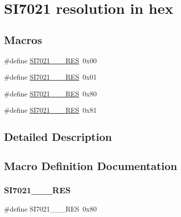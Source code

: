 \hypertarget{group__SI7021__RES__HEX}{}\section{S\+I7021 resolution in hex}
\label{group__SI7021__RES__HEX}
\subsection*{Macros}
\begin{DoxyCompactItemize}
\item 
\#define \hyperlink{group__SI7021__RES__HEX_ga3f5b7867b99b6ee38bb720a3831d7e71}{S\+I7021\+\_\+\_\+\_\+\+R\+ES}~0x00
\item 
\#define \hyperlink{group__SI7021__RES__HEX_ga33d858dee2c4e4a3a7e6fa1bacafcb45}{S\+I7021\+\_\+\_\+\_\+\+R\+ES}~0x01
\item 
\#define \hyperlink{group__SI7021__RES__HEX_ga82a64bcbb964960b65c9d5ee6b35b9b8}{S\+I7021\+\_\+\_\+\_\+\+R\+ES}~0x80
\item 
\#define \hyperlink{group__SI7021__RES__HEX_ga090f53b146c029df6f3d7239087e734b}{S\+I7021\+\_\+\_\+\_\+\+R\+ES}~0x81
\end{DoxyCompactItemize}


\subsection{Detailed Description}


\subsection{Macro Definition Documentation}
\mbox{\label{group__SI7021__RES__HEX_ga82a64bcbb964960b65c9d5ee6b35b9b8}} 
\subsubsection{\texorpdfstring{S\+I7021\+\_\+\_\+\_\+\+R\+ES}{SI7021\_10\_13\_RES}}
{\footnotesize\ttfamily \#define S\+I7021\+\_\+\_\+\_\+\+R\+ES~0x80}

